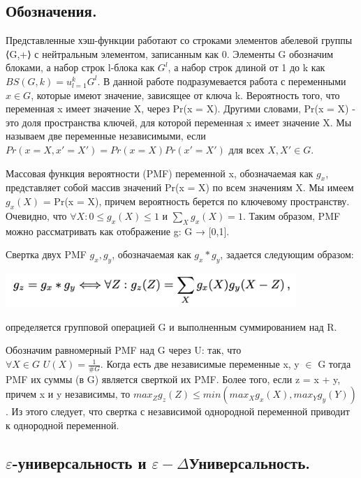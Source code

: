 \documentclass[utf8,14pt,a4paper,oneside,russian]{book}
\begin{document}
\subsection{Обозначения.}

Представленные хэш-функции работают со строками элементов абелевой 
группы ⟨G,+⟩ с нейтральным элементом, записанным как 0. 
Элементы G обозначим блоками, а набор строк l-блока как \(G^l\), 
а набор строк длиной от 1 до k как \(BS(G, k)= u^k_{l=1}  G^l\). 
В данной работе подразумевается работа с переменными \(x \in G\), 
которые имеют значение, зависящее от ключа k. 
Вероятность того, что переменная x имеет значение X, через Pr(x = X). 
Другими словами, Pr(x = X) - это доля пространства ключей, для которой 
переменная x имеет значение X. Мы называем две переменные независимыми, 
если $Pr(x = X, x' = X') = Pr(x = X) Pr(x' = X')$ для всех $X, X' \in G$.

Массовая функция вероятности (PMF) переменной x, обозначаемая как $g_x$, 
представляет собой массив значений Pr(x = X) по всем значениям X. Мы имеем 
$g_x(X)$ = Pr(x = X), причем вероятность берется по ключевому пространству. 
Очевидно, что $\forall X:0 \le g_x(X) \le 1$ и $\sum_X g_x(X)=1$. Таким образом, 
PMF можно рассматривать как отображение g: G → [0,1].

Свертка двух PMF $g_x,g_y$, обозначаемая как $g_x * g_y$, задается следующим 
образом: 

\includegraphics[width=11cm]{form1}

определяется групповой операцией G и выполненным суммированием над R.

Обозначим равномерный PMF над G через U: так, что \\
$\forall X \in G$ $U(X) = \frac {1}{\#G}$. Когда есть две 
независимые переменные x, y $\in$ G 
тогда PMF их суммы (в G) является сверткой их PMF. Более того, если z = x + y, 
причем x и y независимы, то $max_Z g_z(Z) \le min(max_X g_x(X),max_Y g_y(Y))$. 
Из этого следует, что свертка с независимой однородной переменной 
приводит к однородной переменной.

\subsection{$\varepsilon$-универсальность и $\varepsilon-\Delta$Универсальность.}
\end{document}
